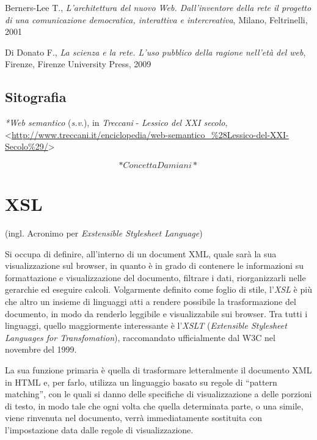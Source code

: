 \documentclass[
  b5paper,
  twoside,
  11pt,
  chapterprefix=false,
  bibliography=totocnumbered,
  parskip=0]{scrbook}
\begin{document}
Berners-Lee T., \emph{L'architettura del nuovo Web. Dall'inventore della
rete il progetto di una comunicazione democratica, interattiva e
intercreativa}, Milano, Feltrinelli, 2001

Di Donato F., \emph{La scienza e la rete. L'uso pubblico della ragione
nell'età del web}, Firenze, Firenze University Press, 2009

\hypertarget{sitografia-33}{%
\section*{Sitografia}\label{sitografia-33}}

\emph{*Web semantico} (\emph{s.v}.), in \emph{Treccani} - \emph{Lessico del XXI secolo},
\textless{}\href{http://www.treccani.it/enciclopedia/web-semantico_\%28Lessico-del-XXI-Secolo\%29/}{{http://www.treccani.it/enciclopedia/web-semantico\_\%28Lessico-del-XXI-Secolo\%29/}}\textgreater{}

\[*Concetta Damiani*\]

\hypertarget{xsl}{%
\chapter{XSL}\label{xsl}}

(ingl. Acronimo per \emph{Exstensible Stylesheet Language})

Si occupa di definire, all'interno di un document XML, quale sarà la sua
visualizzazione sul browser, in quanto è in grado di contenere le
informazioni su formattazione e visualizzazione del documento, filtrare
i dati, riorganizzarli nelle gerarchie ed eseguire calcoli. Volgarmente
definito come foglio di stile, l'\emph{XSL} è più che altro un insieme di
linguaggi atti a rendere possibile la trasformazione del documento, in
modo da renderlo leggibile e visualizzabile sui browser. Tra tutti i
linguaggi, quello maggiormente interessante è l'\emph{XSLT} (\emph{Extensible
Stylesheet Languages for Transfomation}), raccomandato ufficialmente dal
W3C nel novembre del 1999.

La sua funzione primaria è quella di trasformare letteralmente il
documento XML in HTML e, per farlo, utilizza un linguaggio basato su
regole di \enquote{pattern matching}, con le quali si danno delle specifiche di
visualizzazione a delle porzioni di testo, in modo tale che ogni volta
che quella determinata parte, o una simile, viene rinvenuta nel
documento, verrà immediatamente sostituita con l'impostazione data dalle
regole di visualizzazione.
\end{document}
